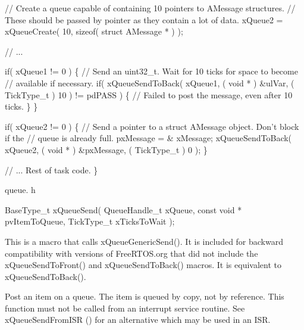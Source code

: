 \begin{DoxyPre}   // Create a queue capable of containing 10 pointers to AMessage structures.
   // These should be passed by pointer as they contain a lot of data.
   xQueue2 = xQueueCreate( 10, sizeof( struct AMessage * ) );\end{DoxyPre}



\begin{DoxyPre}   // ...\end{DoxyPre}



\begin{DoxyPre}   if( xQueue1 != 0 )
   \{
    // Send an uint32\_t.  Wait for 10 ticks for space to become
    // available if necessary.
    if( xQueueSendToBack( xQueue1, ( void * ) \&ulVar, ( TickType\_t ) 10 ) != pdPASS )
    \{
        // Failed to post the message, even after 10 ticks.
    \}
   \}\end{DoxyPre}



\begin{DoxyPre}   if( xQueue2 != 0 )
   \{
    // Send a pointer to a struct AMessage object.  Don't block if the
    // queue is already full.
    pxMessage = \& xMessage;
    xQueueSendToBack( xQueue2, ( void * ) \&pxMessage, ( TickType\_t ) 0 );
   \}\end{DoxyPre}



\begin{DoxyPre}   // ... Rest of task code.
\}
\end{DoxyPre}


queue. h 
\begin{DoxyPre}
BaseType\_t xQueueSend(
                          QueueHandle\_t xQueue,
                          const void * pvItemToQueue,
                          TickType\_t xTicksToWait
                     );
  \end{DoxyPre}


This is a macro that calls x\+Queue\+Generic\+Send(). It is included for backward compatibility with versions of Free\+R\+T\+O\+S.\+org that did not include the x\+Queue\+Send\+To\+Front() and x\+Queue\+Send\+To\+Back() macros. It is equivalent to x\+Queue\+Send\+To\+Back().

Post an item on a queue. The item is queued by copy, not by reference. This function must not be called from an interrupt service routine. See x\+Queue\+Send\+From\+I\+SR () for an alternative which may be used in an I\+SR.



